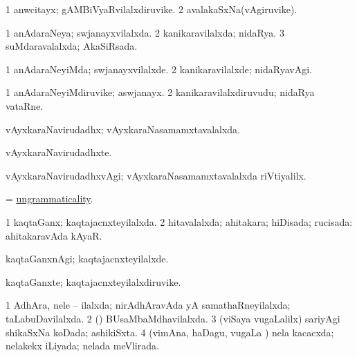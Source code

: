 \bentry
{} 
\gl{\nA}
\expl{}
\bmng
\bnum
\num{1} anwcitayx; gAMBiVyaRvilalxdiruvike. 
\num{2} avalakaSxNa(vAgiruvike). 
\enum
\emng
\eentry

\bentry
{} 
\gl{\gu}
\expl{}
\bmng
\bnum
\num{1} anAdaraNeya; swjanayxvilalxda. 
\num{2} kanikaravilalxda; nidaRya.
\num{3} suMdaravalalxda; AkaSiRsada. 
\enum
\emng
\eentry

\bentry
{} 
\gl{\kirxvi}
\expl{}
\bmng
\bnum
\num{1} anAdaraNeyiMda; swjanayxvilalxde. 
\num{2} kanikaravilalxde; nidaRyavAgi. 
\enum
\emng
\eentry

\bentry
{} 
\gl{\nA}
\expl{}
\bmng
\bnum
\num{1} anAdaraNeyiMdiruvike; aswjanayx. 
\num{2} kanikaravilalxdiruvudu; nidaRya vataRne. 
\enum
\emng
\eentry

\bentry
{} 
\gl{\gu}
\expl{}
\bmng
 vAyxkaraNavirudadhx; vAyxkaraNasamamxtavalalxda. 
\emng
\eentry

\bentry
{} 
\gl{\nA}
\expl{}
\bmng
 vAyxkaraNavirudadhxte. 
\emng
\eentry

\bentry
{} 
\gl{\kirxvi}
\expl{}
\bmng
 vAyxkaraNavirudadhxvAgi; vAyxkaraNasamamxtavalalxda riVtiyalilx. 
\emng
\eentry

\bentry
{} 
\gl{\nA}
\expl{}
\bmng
 = \hyperlink{ungrammaticality}{ungrammaticality}. 
\emng
\eentry

\bentry
{} 
\gl{\gu}
\expl{}
\bmng
\bnum
\num{1} kaqtaGanx; kaqtajacnxteyilalxda. 
\num{2} hitavalalxda; ahitakara; hiDisada; rucisada:  ahitakaravAda kAyaR. 
\enum
\emng
\eentry

\bentry
{} 
\gl{\kirxvi}
\expl{}
\bmng
 kaqtaGanxnAgi; kaqtajacnxteyilalxde. 
\emng
\eentry

\bentry
{} 
\gl{\nA}
\expl{}
\bmng
 kaqtaGanxte; kaqtajacnxteyilalxdiruvike. 
\emng
\eentry

\bentry
{} 
\gl{\gu}
\expl{}
\bmng
\bnum
\num{1} AdhAra, nele -- ilalxda; nirAdhAravAda yA samathaRneyilalxda; taLabuDavilalxda. 
\num{2} (\viduyx) BUsaMbaMdhavilalxda. 
\num{3} (viSaya \mo vugaLalilx) sariyAgi shikaSxNa koDada; ashikiSxta. 
\num{4} (vimAna, haDagu, \mo vugaLa \vi) nela kacacxda; nelakekx iLiyada; nelada meVlirada. 
\enum
\emng
\eentry

